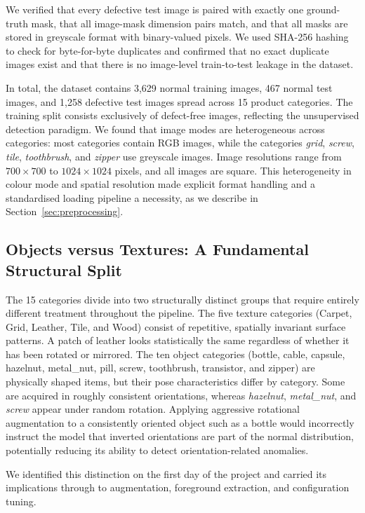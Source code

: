 \documentclass[11pt, a4paper]{article}
\begin{document}
We verified that every defective test image is paired with exactly one ground-truth mask, that all image-mask dimension pairs match, and that all masks are stored in greyscale format with binary-valued pixels. We used SHA-256 hashing to check for byte-for-byte duplicates and confirmed that no exact duplicate images exist and that there is no image-level train-to-test leakage in the dataset.

In total, the dataset contains 3,629 normal training images, 467 normal test images, and 1,258 defective test images spread across 15 product categories. The training split consists exclusively of defect-free images, reflecting the unsupervised detection paradigm. We found that image modes are heterogeneous across categories: most categories contain RGB images, while the categories \textit{grid}, \textit{screw}, \textit{tile}, \textit{toothbrush}, and \textit{zipper} use greyscale images. Image resolutions range from $700 \times 700$ to $1024 \times 1024$ pixels, and all images are square. This heterogeneity in colour mode and spatial resolution made explicit format handling and a standardised loading pipeline a necessity, as we describe in Section~\ref{sec:preprocessing}.

\subsection{Objects versus Textures: A Fundamental Structural Split}

The 15 categories divide into two structurally distinct groups that require entirely different treatment throughout the pipeline. The five texture categories (Carpet, Grid, Leather, Tile, and Wood) consist of repetitive, spatially invariant surface patterns. A patch of leather looks statistically the same regardless of whether it has been rotated or mirrored. The ten object categories (bottle, cable, capsule, hazelnut, metal\_nut, pill, screw, toothbrush, transistor, and zipper) are physically shaped items, but their pose characteristics differ by category. Some are acquired in roughly consistent orientations, whereas \textit{hazelnut}, \textit{metal\_nut}, and \textit{screw} appear under random rotation. Applying aggressive rotational augmentation to a consistently oriented object such as a bottle would incorrectly instruct the model that inverted orientations are part of the normal distribution, potentially reducing its ability to detect orientation-related anomalies.

We identified this distinction on the first day of the project and carried its implications through to augmentation, foreground extraction, and configuration tuning.
\end{document}
